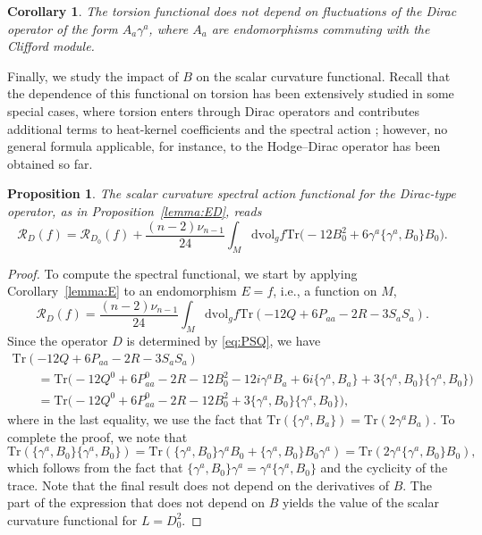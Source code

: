 \documentclass[10pt,a4paper]{amsart}
\numberwithin{equation}{section}
\newtheorem{Corollary}[Theorem]{Corollary}
\newtheorem{Proposition}[Theorem]{Proposition}
\theoremstyle{definition}
\def\Tr{\mathrm{Tr}}
\def\dv{\mathrm{dvol}_g}
\begin{document}
\begin{Corollary}
	The torsion functional does not depend on fluctuations of the Dirac operator of the form $A_a \gamma^a$, where $A_a$ are endomorphisms commuting with the Clifford module.
\end{Corollary}

Finally, we study the impact of $B$ on the scalar curvature functional. Recall that the dependence of this functional on torsion has been extensively studied in some special cases, where torsion enters through Dirac operators and contributes additional terms to heat-kernel coefficients and the spectral action \cite{Iochum12,Pfaffle12}; however, no general formula applicable, for instance, to the Hodge--Dirac operator has been obtained so far.
	\begin{Proposition}
		\label{prop:SA}
		The scalar curvature spectral action functional for the Dirac-type operator, as in Proposition~{\rm\ref{lemma:ED}}, reads
		\[
				\mathscr{R}_D(f)=\mathscr{R}_{D_0}(f)+ \frac{(n-2)\nu_{n-1}}{24}\int_M \dv f \Tr\bigl(
				-12B_0^2 + 6\gamma^a\{\gamma^a,B_0\}B_0\bigr).
			\]
	\end{Proposition}
	
	\begin{proof}
		To compute the spectral functional, we start by applying Corollary~\ref{lemma:E} to an endomorphism $E=f$, i.e., a function on $M$,
		\[
			\mathscr{R}_D(f)=\frac{(n-2)\nu_{n-1}}{24}\int_M \dv f \Tr(-12Q+6P_{aa}-2R-3S_aS_a).
		\]
		Since the operator $D$ is determined by \eqref{eq:PSQ}, we have
		\begin{gather*}
				\Tr(-12Q+6P_{aa}-2R-3S_aS_a)\\
\qquad= \Tr\bigl(-12Q^0+6P^0_{aa}-2R-12B_0^2-12i\gamma^aB_a
				+6i\{\gamma^a,B_a\}+3\{\gamma^a,B_0\}\{\gamma^a,B_0\}\bigr)\\
				\qquad=\Tr\bigl(-12Q^0+6P^0_{aa}-2R-12B_0^2+3\{\gamma^a,B_0\}\{\gamma^a,B_0\}\bigr),
			\end{gather*}
		where in the last equality, we use the fact that $\Tr(\{\gamma^a,B_a\})=\Tr(2\gamma^aB_a)$. To complete the proof, we note that
		\[
				\Tr(\{\gamma^a,B_0\}\{\gamma^a,B_0\})=\Tr (\{\gamma^a,B_0\}\gamma^aB_0+\{\gamma^a,B_0\}B_0\gamma^a) =\Tr(2\gamma^a\{\gamma^a,B_0\}B_0),
			\]
		which follows from the fact that $\{\gamma^a,B_0\}\gamma^a=\gamma^a\{\gamma^a,B_0\}$ and the cyclicity of the trace.
		Note that the final result does not depend on the derivatives of $B$. The part of the expression that does not depend on $B$ yields the value of the scalar curvature functional for $L=D_0^2$.
	\end{proof}
	
\end{document}
